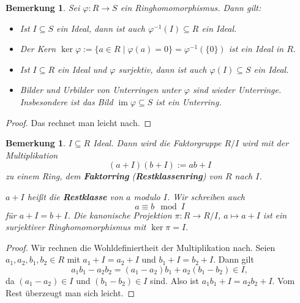 \documentclass[a4paper, twoside, 11pt, ngerman]{report}
\DeclareMathOperator{\image}{im}
\theoremstyle{definistyle}
\newtheorem{bem}[satz]{Bemerkung}
\theoremstyle{remark}
\newcommand{\defn}[1]{\textit{\bfseries #1}}
\begin{document}
\begin{bem}\label{bem:ringhom_idealeigenschaften}
Sei $\varphi \colon R \to S$ ein Ringhomomorphismus. Dann gilt:
\begin{itemize}
    \item[(a)] Ist $I \subseteq S$ ein Ideal, dann ist auch $\varphi^{-1}(I) \subseteq R$ ein Ideal.
    \item[(b)] Der Kern $\ker \varphi := \{a \in R \mid \varphi(a) = 0\} = \varphi^{-1}(\{0\})$ ist ein Ideal in $R$.
    \item[(c)] Ist $I \subseteq R$ ein Ideal und $\varphi$ surjektiv, dann ist auch $\varphi(I) \subseteq S$ ein Ideal.
    \item[(d)] Bilder und Urbilder von Unterringen unter $\varphi$ sind wieder Unterringe. Insbesondere ist das Bild $\image \varphi \subseteq S$ ist ein Unterring.
\end{itemize}
\end{bem}

\begin{proof}
Das rechnet man leicht nach.
\end{proof}

\begin{bem}\label{bem:faktorring}
$ I \subseteq R $ Ideal. Dann wird die Faktorgruppe $ R / I $ wird mit der Multiplikation
\[
(a + I)(b + I) := ab + I
\]
zu einem Ring, dem \defn{Faktorring} (\defn{Restklassenring}) von $ R $ nach $ I $.

$a+I$ heißt die \defn{Restklasse} von $a$ modulo $I$. Wir schreiben auch
\[
a\equiv b \mod I
\]
für $a+I=b+I$.
Die kanonische Projektion $ \pi \colon R \to R / I $, $ a \mapsto a + I $ ist ein surjektiver Ringhomomorphismus mit $ \ker \pi = I $.
\end{bem}

\begin{proof}
Wir rechnen die Wohldefiniertheit der Multiplikation nach. Seien $ a_1, a_2, b_1, b_2 \in R $ mit $ a_1 + I = a_2 + I $ und $ b_1 + I = b_2 + I $. Dann gilt
\[
a_1 b_1 - a_2 b_2 = (a_1 - a_2)b_1 + a_2(b_1 - b_2) \in I,
\]
da $ (a_1 - a_2) \in I $ und $ (b_1 - b_2) \in I $ sind. Also ist $ a_1 b_1 + I = a_2 b_2 + I $.
Vom Rest überzeugt man sich leicht.
\end{proof}
\end{document}

